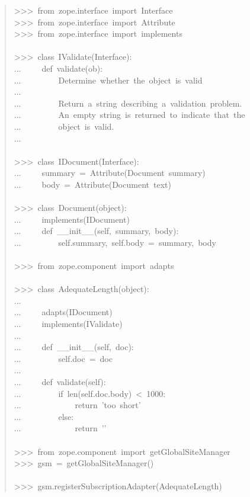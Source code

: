 \documentclass[a4paper,openany,twoside,final]{book}
\begin{document}
\begin{quote}{\ttfamily \raggedright \noindent
>{}>{}>~from~zope.interface~import~Interface\\
>{}>{}>~from~zope.interface~import~Attribute\\
>{}>{}>~from~zope.interface~import~implements\\
~\\
>{}>{}>~class~IValidate(Interface):\\
...~~~~~def~validate(ob):\\
...~~~~~~~~~\textquotedbl{}\textquotedbl{}\textquotedbl{}Determine~whether~the~object~is~valid\\
...\\
...~~~~~~~~~Return~a~string~describing~a~validation~problem.\\
...~~~~~~~~~An~empty~string~is~returned~to~indicate~that~the\\
...~~~~~~~~~object~is~valid.\\
...~~~~~~~~~\textquotedbl{}\textquotedbl{}\textquotedbl{}\\
~\\
>{}>{}>~class~IDocument(Interface):\\
...~~~~~summary~=~Attribute(\textquotedbl{}Document~summary\textquotedbl{})\\
...~~~~~body~=~Attribute(\textquotedbl{}Document~text\textquotedbl{})\\
~\\
>{}>{}>~class~Document(object):\\
...~~~~~implements(IDocument)\\
...~~~~~def~\_\_init\_\_(self,~summary,~body):\\
...~~~~~~~~~self.summary,~self.body~=~summary,~body\\
~\\
>{}>{}>~from~zope.component~import~adapts\\
~\\
>{}>{}>~class~AdequateLength(object):\\
...\\
...~~~~~adapts(IDocument)\\
...~~~~~implements(IValidate)\\
...\\
...~~~~~def~\_\_init\_\_(self,~doc):\\
...~~~~~~~~~self.doc~=~doc\\
...\\
...~~~~~def~validate(self):\\
...~~~~~~~~~if~len(self.doc.body)~<~1000:\\
...~~~~~~~~~~~~~return~'too~short'\\
...~~~~~~~~~else:\\
...~~~~~~~~~~~~~return~'{}'\\
~\\
>{}>{}>~from~zope.component~import~getGlobalSiteManager\\
>{}>{}>~gsm~=~getGlobalSiteManager()\\
~\\
>{}>{}>~gsm.registerSubscriptionAdapter(AdequateLength)
}
\end{quote}
\end{document}
